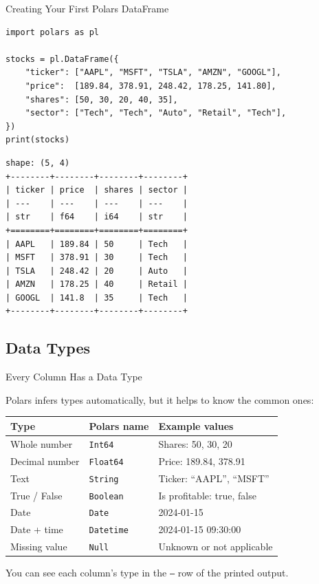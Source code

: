 \documentclass[9pt,aspectratio=169]{beamer}
\begin{document}
\begin{frame}[fragile]{Creating Your First Polars DataFrame}

\begin{lstlisting}
import polars as pl

stocks = pl.DataFrame({
    "ticker": ["AAPL", "MSFT", "TSLA", "AMZN", "GOOGL"],
    "price":  [189.84, 378.91, 248.42, 178.25, 141.80],
    "shares": [50, 30, 20, 40, 35],
    "sector": ["Tech", "Tech", "Auto", "Retail", "Tech"],
})
print(stocks)
\end{lstlisting}

\begin{lstlisting}[style=output]
shape: (5, 4)
+--------+--------+--------+--------+
| ticker | price  | shares | sector |
| ---    | ---    | ---    | ---    |
| str    | f64    | i64    | str    |
+========+========+========+========+
| AAPL   | 189.84 | 50     | Tech   |
| MSFT   | 378.91 | 30     | Tech   |
| TSLA   | 248.42 | 20     | Auto   |
| AMZN   | 178.25 | 40     | Retail |
| GOOGL  | 141.8  | 35     | Tech   |
+--------+--------+--------+--------+
\end{lstlisting}

\end{frame}


\subsection{Data Types}
\begin{frame}{Every Column Has a Data Type}

Polars \alert{infers} types automatically, but it helps to know the common ones:

\medskip

\begin{tabular}{@{}llp{5cm}@{}}
\toprule
\textbf{Type} & \textbf{Polars name} & \textbf{Example values} \\
\midrule
Whole number & \texttt{Int64} & Shares: 50, 30, 20 \\[0.3em]
Decimal number & \texttt{Float64} & Price: 189.84, 378.91 \\[0.3em]
Text & \texttt{String} & Ticker: ``AAPL'', ``MSFT'' \\[0.3em]
True / False & \texttt{Boolean} & Is profitable: true, false \\[0.3em]
Date & \texttt{Date} & 2024-01-15 \\[0.3em]
Date + time & \texttt{Datetime} & 2024-01-15 09:30:00 \\[0.3em]
Missing value & \texttt{Null} & Unknown or not applicable \\
\bottomrule
\end{tabular}

\medskip

\begin{highlightbox}
\centering
You can see each column's type in the \texttt{---} row of the printed output.
\end{highlightbox}

\end{frame}
\end{document}
